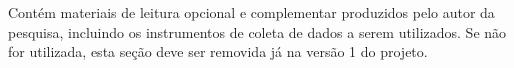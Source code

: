
Contém materiais de leitura opcional e complementar produzidos pelo autor da pesquisa, incluindo os instrumentos de coleta de dados a serem utilizados. Se não for utilizada, esta seção deve ser removida já na versão 1 do projeto.